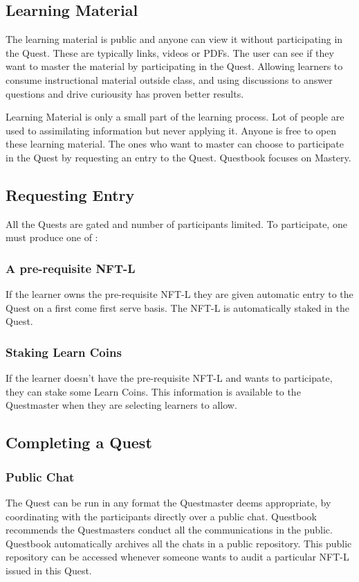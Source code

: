 \documentclass{article}
\begin{document}
    \subsection{Learning Material}
        The learning material is public and anyone can view it without participating in the Quest. 
        These are typically links, videos or PDFs. The user can see if they want to master the material by participating in the Quest. 
        Allowing learners to consume instructional material outside class, and using discussions to answer questions and drive curiousity has proven better results. %
        \par
        Learning Material is only a small part of the learning process. Lot of people are used to assimilating information but never applying it. 
        Anyone is free to open these learning material. 
        The ones who want to master can choose to participate in the Quest by requesting an entry to the Quest.
        Questbook focuses on Mastery. %
    \subsection{Requesting Entry}
        All the Quests are gated and number of participants limited. To participate, one must produce one of :
        \subsubsection{A pre-requisite NFT-L}
          If the learner owns the pre-requisite NFT-L they are given automatic entry to the Quest on a first come first serve basis. The NFT-L is automatically staked in the Quest.
        \subsubsection{Staking Learn Coins}
          If the learner doesn't have the pre-requisite NFT-L and wants to participate, they can stake some Learn Coins. This information is available to the Questmaster when they are selecting learners to allow.
    \subsection{Completing a Quest}
        \subsubsection{Public Chat}
          The Quest can be run in any format the Questmaster deems appropriate, by coordinating with the participants directly over a public chat. 
          Questbook recommends the Questmasters conduct all the communications in the public. Questbook automatically archives all the chats in a public repository.
          This public repository can be accessed whenever someone wants to audit a particular NFT-L issued in this Quest.
\end{document}
